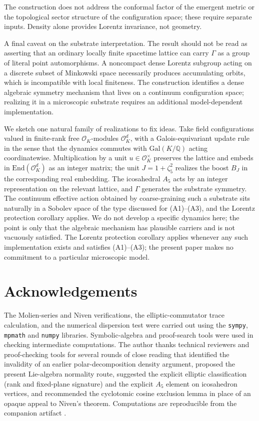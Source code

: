 \documentclass[11pt]{article}
\theoremstyle{remark}
\begin{document}
The construction does not address the conformal factor of the
emergent metric or the topological sector structure of the
configuration space; these require separate inputs. Density alone
provides Lorentz invariance, not geometry.

A final caveat on the substrate interpretation. The result should not
be read as asserting that an ordinary locally finite spacetime
lattice can carry $\Gamma$ as a group of literal point automorphisms.
A noncompact dense Lorentz subgroup acting on a discrete subset of
Minkowski space necessarily produces accumulating orbits, which is
incompatible with local finiteness. The construction identifies a
dense algebraic symmetry mechanism that lives on a continuum
configuration space; realizing it in a microscopic substrate requires
an additional model-dependent implementation.

We sketch one natural family of realizations to fix ideas. Take field
configurations valued in finite-rank free $\mathcal{O}_K$-modules
$\mathcal{O}_K^d$, with a Galois-equivariant update rule in the
sense that the dynamics commutes with $\mathrm{Gal}(K / \mathbb{Q})$
acting coordinatewise. Multiplication by a unit
$u \in \mathcal{O}_K^\times$ preserves the lattice and embeds in
$\mathrm{End}(\mathcal{O}_K^d)$ as an integer matrix; the unit
$J = 1 + \zeta_5^2$ realizes the boost $B_J$ in the corresponding
real embedding. The icosahedral $A_5$ acts by an integer
representation on the relevant lattice, and $\Gamma$ generates the
substrate symmetry. The continuum effective action obtained by
coarse-graining such a substrate sits naturally in a Sobolev space of
the type discussed for (A1)--(A3), and the Lorentz protection
corollary applies. We do not develop a specific dynamics here; the
point is only that the algebraic mechanism has plausible carriers and
is not vacuously satisfied. The Lorentz protection corollary applies
whenever any such implementation exists and satisfies (A1)--(A3); the
present paper makes no commitment to a particular microscopic model.


\section*{Acknowledgements}

The Molien-series and Niven verifications, the elliptic-commutator
trace calculation, and the numerical dispersion test were carried out
using the \texttt{sympy}, \texttt{mpmath} and \texttt{numpy}
libraries. Symbolic-algebra and proof-search tools were used in
checking intermediate computations. The author thanks technical
reviewers and proof-checking tools for several rounds of close
reading that identified the invalidity of an earlier
polar-decomposition density argument, proposed the present
Lie-algebra normality route, suggested the explicit elliptic
classification (rank and fixed-plane signature) and the explicit
$A_5$ element on icosahedron vertices, and recommended the cyclotomic
cosine exclusion lemma in place of an opaque appeal to Niven's
theorem. Computations are reproducible from the companion artifact
\cite{ALPCode}.
\end{document}
